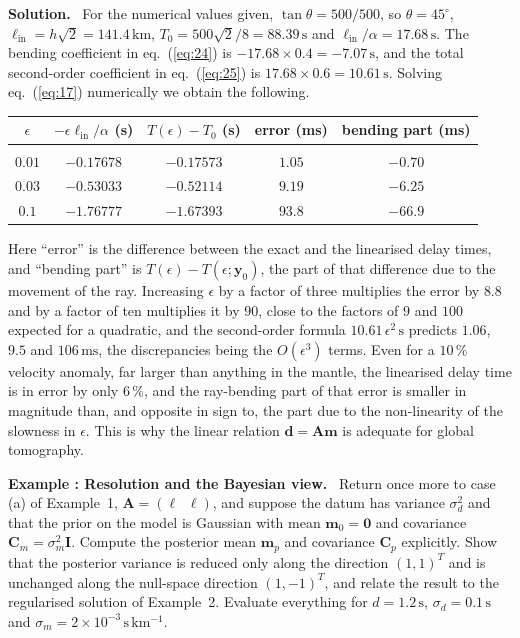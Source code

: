 \documentclass[a4paper,12pt]{paper}
\newcounter{example}
\renewenvironment{example}[1]{%
  \refstepcounter{example}%
  \begin{mdframed}[linewidth=1pt,innertopmargin=6pt,innerbottommargin=6pt]%
  \noindent\textbf{Example \theexample: #1.}\ }{%
  \end{mdframed}}
\newenvironment{solution}{\par\noindent\textbf{Solution.}\ }{\par\medskip}
\begin{document}
\begin{solution}
For the numerical values given, $\tan\theta = 500/500$, so $\theta = 45^{\circ}$,
$\ell_{\mathrm{in}}=h\sqrt{2}=141.4\,\mathrm{km}$, $T_{0}=500\sqrt{2}/8 = 88.39\,\mathrm{s}$ and
$\ell_{\mathrm{in}}/\alpha = 17.68\,\mathrm{s}$. The bending coefficient in eq.~(\ref{eq:24}) is
$-17.68\times0.4 = -7.07\,\mathrm{s}$, and the total second-order coefficient in eq.~(\ref{eq:25}) is
$17.68\times0.6=10.61\,\mathrm{s}$. Solving eq.~(\ref{eq:17}) numerically we obtain the following.
\begin{center}
\begin{tabular}{ccccc}
    $\epsilon$ & $-\epsilon\ell_{\mathrm{in}}/\alpha$ (s) & $T(\epsilon)-T_{0}$ (s) &
    error (ms) & bending part (ms) \\[2pt]
    \hline\\[-8pt]
    $0.01$ & $-0.17678$ & $-0.17573$ & $1.05$  & $-0.70$ \\
    $0.03$ & $-0.53033$ & $-0.52114$ & $9.19$  & $-6.25$ \\
    $0.1$  & $-1.76777$ & $-1.67393$ & $93.8$  & $-66.9$ \\
\end{tabular}
\end{center}
Here ``error'' is the difference between the exact and the linearised delay times, and ``bending
part'' is $T(\epsilon)-T(\epsilon;\mathbf{y}_{0})$, the part of that difference due to the movement of
the ray. Increasing $\epsilon$ by a factor of three multiplies the error by $8.8$ and by a factor of
ten multiplies it by $90$, close to the factors of $9$ and $100$ expected for a quadratic, and the
second-order formula $10.61\,\epsilon^{2}\,\mathrm{s}$ predicts $1.06$, $9.5$ and $106\,\mathrm{ms}$,
the discrepancies being the $O(\epsilon^{3})$ terms. Even for a $10\,\%$ velocity anomaly, far larger
than anything in the mantle, the linearised delay time is in error by only $6\,\%$, and the
ray-bending part of that error is smaller in magnitude than, and opposite in sign to, the part due to
the non-linearity of the slowness in $\epsilon$. This is why the linear relation
$\mathbf{d}=\mathbf{A}\mathbf{m}$ is adequate for global tomography.
\end{solution}

\begin{example}{Resolution and the Bayesian view}
Return once more to case (a) of Example~1, $\mathbf{A}=(\ell\;\;\ell)$, and suppose the datum has
variance $\sigma_{d}^{2}$ and that the prior on the model is Gaussian with mean $\mathbf{m}_{0}=\mathbf{0}$
and covariance $\mathbf{C}_{m}=\sigma_{m}^{2}\mathbf{I}$. Compute the posterior mean $\mathbf{m}_{p}$ and
covariance $\mathbf{C}_{p}$ explicitly. Show that the posterior variance is reduced only along the
direction $(1,1)^{T}$ and is unchanged along the null-space direction $(1,-1)^{T}$, and relate
the result to the regularised solution of Example~2. Evaluate everything for
$d=1.2\,\mathrm{s}$, $\sigma_{d}=0.1\,\mathrm{s}$ and $\sigma_{m}=2\times10^{-3}\,\mathrm{s\,km^{-1}}$.
\end{example}
\end{document}
